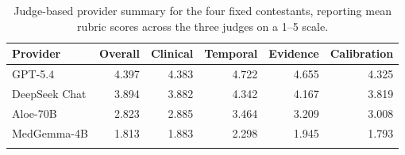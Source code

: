\begin{table}[t]
\caption{Judge-based provider summary for the four fixed contestants, reporting mean rubric scores across the three judges on a 1--5 scale.}
\label{tab:judge_provider_summary}
\centering
\scriptsize
\begin{tabular}{@{}lrrrrr@{}}
\toprule
Provider & Overall & Clinical & Temporal & Evidence & Calibration \\
\midrule
GPT-5.4 & 4.397 & 4.383 & 4.722 & 4.655 & 4.325 \\
DeepSeek Chat & 3.894 & 3.882 & 4.342 & 4.167 & 3.819 \\
Aloe-70B & 2.823 & 2.885 & 3.464 & 3.209 & 3.008 \\
MedGemma-4B & 1.813 & 1.883 & 2.298 & 1.945 & 1.793 \\
\botrule
\end{tabular}
\normalsize
\end{table}
